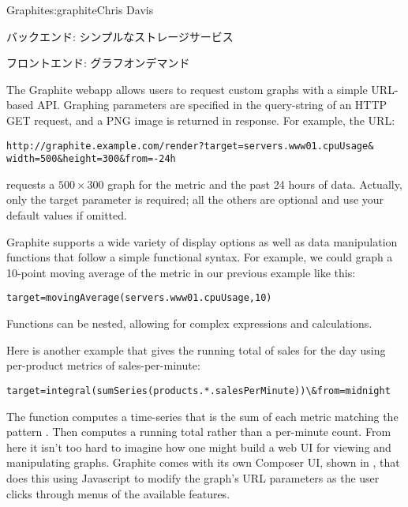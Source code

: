 \begin{aosachapter}{Graphite}{s:graphite}{Chris Davis}
\begin{aosasect1}{バックエンド: シンプルなストレージサービス}
\end{aosasect1}

\begin{aosasect1}{フロントエンド: グラフオンデマンド}

The Graphite webapp allows users to request custom graphs with a
simple URL-based API\@. Graphing parameters are specified in the
query-string of an HTTP GET request, and a PNG image is returned in
response. For example, the URL:
\begin{verbatim}
http://graphite.example.com/render?target=servers.www01.cpuUsage&
width=500&height=300&from=-24h
\end{verbatim}

\noindent requests a $500{\times}300$ graph for the metric
 and the past 24 hours of data. Actually,
only the target parameter is required; all the others are optional and
use your default values if omitted.

Graphite supports a wide variety of display options as well as data
manipulation functions that follow a simple functional syntax. For
example, we could graph a 10-point moving average of the metric in our
previous example like this:

\begin{verbatim}
target=movingAverage(servers.www01.cpuUsage,10)
\end{verbatim}

\noindent
Functions can be nested, allowing for complex expressions and
calculations.

\pagebreak

Here is another example that gives the running total of sales for the
day using per-product metrics of sales-per-minute:

\begin{verbatim}
target=integral(sumSeries(products.*.salesPerMinute))\&from=midnight
\end{verbatim}

\noindent
The  function computes a time-series that is the sum
of each metric matching the pattern
. Then  computes a
running total rather than a per-minute count. From here it isn't too
hard to imagine how one might build a web UI for viewing and
manipulating graphs. Graphite comes with its own Composer UI, shown in
, that does this using Javascript to modify the
graph's URL parameters as the user clicks through menus of the
available features.


\end{aosasect1}
\end{aosachapter}
